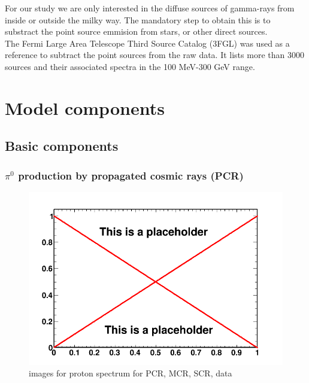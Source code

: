 For our study we are only interested in the diffuse sources of gamma-rays from inside or outside the milky way. The mandatory step to obtain this is to substract the point source emmision from stars, or other direct sources.\\

The Fermi Large Area Telescope Third Source Catalog (3FGL) was used as a reference to subtract the point sources from the raw data. It lists more than 3000 sources and their associated spectra in the 100 MeV-300 GeV range.\\





\section{Model components}
\subsection{Basic components}

\subsubsection{$\pi^0$ production by propagated cosmic rays (PCR)}

\begin{figure}
 \centering
 \includegraphics[width=.9\linewidth]{pic/dummy.png}
 \caption{images for proton spectrum for PCR, MCR, SCR, data}
 \label{fig:proton_spec}
\end{figure}

